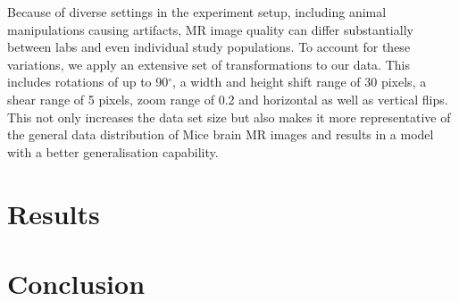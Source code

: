 \documentclass{article}
\begin{document}
Because of diverse settings in the experiment setup, including animal manipulations causing artifacts, MR image quality can differ substantially between labs and even individual study populations.
To account for these variations, we apply an extensive set of transformations to our data.
This includes rotations of up to 90$^{\circ}$, a width and height shift range of 30 pixels, a shear range of 5 pixels, zoom range of 0.2 and horizontal as well as vertical flips.
This not only increases the data set size but also makes it more representative of the general data distribution of Mice brain MR images and results in a model with a better generalisation capability.

\section{Results}

\section{Conclusion}




\end{document}
